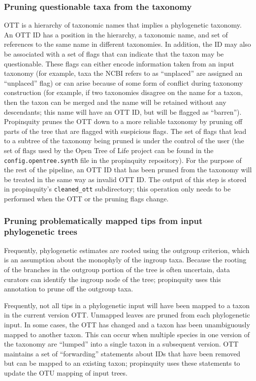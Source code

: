 \documentclass[fleqn,12pt,lineno,english]{wlpeerj}
\begin{document}
\subsubsection{Pruning questionable taxa from the taxonomy}

OTT is a hierarchy of taxonomic names that implies a phylogenetic
taxonomy. An OTT ID has a position in the hierarchy, a taxonomic name,
and set of references to the same name in different taxonomies. In
addition, the ID may also be associated with a set of flags that can
indicate that the taxon may be questionable. These flags can either
encode information taken from an input taxonomy (for example, taxa
the NCBI refers to as ``unplaced'' are assigned an ``unplaced''
flag) or can arise because of some form of conflict during taxonomy
construction (for example, if two taxonomies disagree on the name
for a taxon, then the taxon can be merged and the name will be retained
without any descendants; this name will have an OTT ID, but will be
flagged as ``barren''). Propinquity prunes the OTT down to a more
reliable taxonomy by pruning off parts of the tree that are flagged
with suspicious flags. The set of flags that lead to a subtree of
the taxonomy being pruned is under the control of the user (the set
of flags used by the Open Tree of Life project can be found in the
\texttt{config.opentree.synth} file in the propinquity repository).
For the purpose of the rest of the pipeline, an OTT ID that has been
pruned from the taxonomy will be treated in the same way as invalid
OTT ID. The output of this step is stored in propinquity's \texttt{cleaned\_ott}
subdirectory; this operation only needs to be performed when the OTT
or the pruning flags change.

\subsubsection{Pruning problematically mapped tips from input phylogenetic trees}

Frequently, phylogenetic estimates are rooted using the outgroup criterion,
which is an assumption about the monophyly of the ingroup taxa. Because
the rooting of the branches in the outgroup portion of the tree is
often uncertain, data curators can identify the ingroup node of the
tree; propinquity uses this annotation to prune off the outgroup taxa.

Frequently, not all tips in a phylogenetic input will have been mapped
to a taxon in the current version OTT. Unmapped leaves are pruned
from each phylogenetic input. In some cases, the OTT has changed and
a taxon has been unambiguously mapped to another taxon. This can occur
when multiple species in one version of the taxonomy are ``lumped''
into a single taxon in a subsequent version. OTT maintains a set of
``forwarding'' statements about IDs that have been removed but can
be mapped to an existing taxon; propinquity uses these statements
to update the OTU mapping of input trees.
\end{document}
